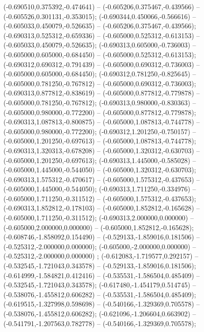  (-0.690510,0.375392,-0.474641) -- (-0.605206,0.375467,-0.439566) -- (-0.605526,0.301131,-0.353015);
 (-0.690344,0.450066,-0.566616) -- (-0.605033,0.450079,-0.526635) -- (-0.605206,0.375467,-0.439566);
 (-0.690313,0.525312,-0.659336) -- (-0.605000,0.525312,-0.613153) -- (-0.605033,0.450079,-0.526635);
 (-0.690313,0.605000,-0.736003) -- (-0.605000,0.605000,-0.684450) -- (-0.605000,0.525312,-0.613153);
 (-0.690312,0.690312,-0.791439) -- (-0.605000,0.690312,-0.736003) -- (-0.605000,0.605000,-0.684450);
 (-0.690312,0.781250,-0.825645) -- (-0.605000,0.781250,-0.767812) -- (-0.605000,0.690312,-0.736003);
 (-0.690313,0.877812,-0.838619) -- (-0.605000,0.877812,-0.779878) -- (-0.605000,0.781250,-0.767812);
 (-0.690313,0.980000,-0.830363) -- (-0.605000,0.980000,-0.772200) -- (-0.605000,0.877812,-0.779878);
 (-0.690313,1.087813,-0.800875) -- (-0.605000,1.087813,-0.744778) -- (-0.605000,0.980000,-0.772200);
 (-0.690312,1.201250,-0.750157) -- (-0.605000,1.201250,-0.697613) -- (-0.605000,1.087813,-0.744778);
 (-0.690313,1.320313,-0.678208) -- (-0.605000,1.320312,-0.630703) -- (-0.605000,1.201250,-0.697613);
 (-0.690313,1.445000,-0.585028) -- (-0.605000,1.445000,-0.544050) -- (-0.605000,1.320312,-0.630703);
 (-0.690313,1.575312,-0.470617) -- (-0.605000,1.575312,-0.437653) -- (-0.605000,1.445000,-0.544050);
 (-0.690313,1.711250,-0.334976) -- (-0.605000,1.711250,-0.311512) -- (-0.605000,1.575312,-0.437653);
 (-0.690313,1.852812,-0.178103) -- (-0.605000,1.852812,-0.165628) -- (-0.605000,1.711250,-0.311512);
 (-0.690313,2.000000,0.000000) -- (-0.605000,2.000000,0.000000) -- (-0.605000,1.852812,-0.165628);
 (-0.608746,-1.858092,0.154490) -- (-0.529133,-1.859016,0.181506) -- (-0.525312,-2.000000,0.000000);
 (-0.605000,-2.000000,0.000000) -- (-0.525312,-2.000000,0.000000) ;
 (-0.612083,-1.719577,0.292157) -- (-0.532545,-1.721043,0.343578) -- (-0.529133,-1.859016,0.181506);
 (-0.614999,-1.584821,0.412416) -- (-0.535531,-1.586504,0.485409) -- (-0.532545,-1.721043,0.343578);
 (-0.617480,-1.454179,0.514745) -- (-0.538076,-1.455812,0.606282) -- (-0.535531,-1.586504,0.485409);
 (-0.619515,-1.327998,0.598698) -- (-0.540166,-1.329369,0.705578) -- (-0.538076,-1.455812,0.606282);
 (-0.621096,-1.206604,0.663902) -- (-0.541791,-1.207563,0.782778) -- (-0.540166,-1.329369,0.705578);
